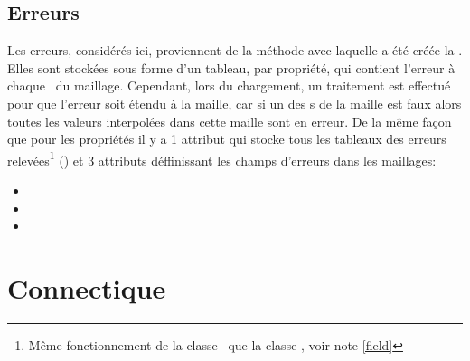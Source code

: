     \subsection{Erreurs}
    Les erreurs, considérés ici, proviennent de la méthode avec laquelle a été créée la \bdd.
    Elles sont stockées sous forme d'un tableau, par propriété, qui contient l'erreur à chaque \n\ du maillage.
    Cependant, lors du chargement, un traitement est effectué pour que l'erreur soit étendu à la maille,
    car si un des \n s de la maille est faux alors toutes les valeurs interpolées dans cette maille sont en erreur.
    \smallbreak\vspace{0.3cm}
    De la même façon que pour les propriétés il y a 1 attribut qui stocke tous les tableaux des erreurs 
    relevées\footnote{Même fonctionnement de la classe \EFIELD\ que la classe \FIELD, voir note \ref{field}} ()
    et 3 attributs déffinissant les champs d'erreurs dans les maillages:
    \vspace{0.3cm}
    \begin{itemize}
      \item {} 
      \item {} 
      \item {} 
    \end{itemize}
    \vspace{0.5cm}
   
   
   \section{Connectique}\label{connectique}
   
